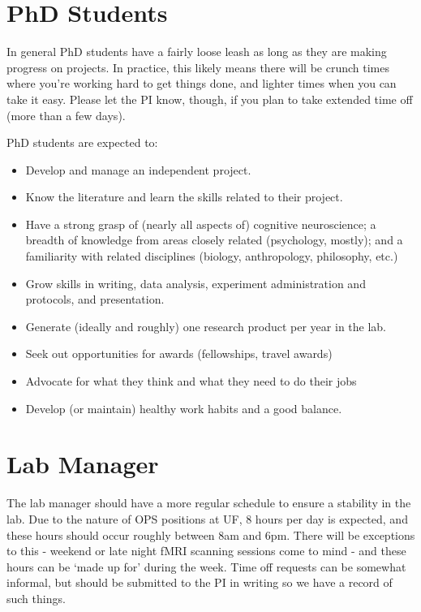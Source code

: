 \documentclass[
  12pt,
]{book}
\begin{document}
\hypertarget{phd-students}{%
\section{PhD Students}\label{phd-students}}

In general PhD students have a fairly loose leash as long as they are making progress on projects. In practice, this likely means there will be crunch times where you're working hard to get things done, and lighter times when you can take it easy. Please let the PI know, though, if you plan to take extended time off (more than a few days).

PhD students are expected to:

\begin{itemize}
\item
  Develop and manage an independent project.
\item
  Know the literature and learn the skills related to their project.
\item
  Have a strong grasp of (nearly all aspects of) cognitive neuroscience; a breadth of knowledge from areas closely related (psychology, mostly); and a familiarity with related disciplines (biology, anthropology, philosophy, etc.)
\item
  Grow skills in writing, data analysis, experiment administration and protocols, and presentation.
\item
  Generate (ideally and roughly) one research product per year in the lab.
\item
  Seek out opportunities for awards (fellowships, travel awards)
\item
  Advocate for what they think and what they need to do their jobs
\item
  Develop (or maintain) healthy work habits and a good balance.
\end{itemize}

\hypertarget{lab-manager}{%
\section{Lab Manager}\label{lab-manager}}

The lab manager should have a more regular schedule to ensure a stability in the lab. Due to the nature of OPS positions at UF, 8 hours per day is expected, and these hours should occur roughly between 8am and 6pm. There will be exceptions to this - weekend or late night fMRI scanning sessions come to mind - and these hours can be `made up for' during the week. Time off requests can be somewhat informal, but should be submitted to the PI in writing so we have a record of such things.
\end{document}
